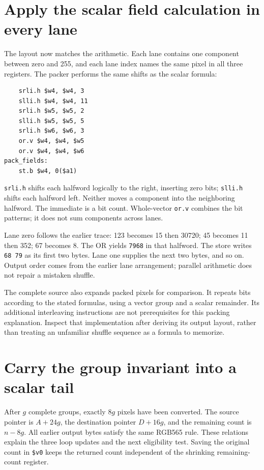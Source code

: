 \section{Apply the scalar field calculation in every lane}

The layout now matches the arithmetic. Each lane contains one component between
zero and 255, and each lane index names the same pixel in all three registers.
The packer performs the same shifts as the scalar formula:
\begin{verbatim}
    srli.h $w4, $w4, 3
    slli.h $w4, $w4, 11
    srli.h $w5, $w5, 2
    slli.h $w5, $w5, 5
    srli.h $w6, $w6, 3
    or.v $w4, $w4, $w5
    or.v $w4, $w4, $w6
pack_fields:
    st.b $w4, 0($a1)
\end{verbatim}
\texttt{srli.h} shifts each halfword logically to the right, inserting zero bits;
\texttt{slli.h} shifts each halfword left. Neither moves a component into the
neighboring halfword. The immediate is a bit count. Whole-vector \texttt{or.v}
combines the bit patterns; it does not sum components across lanes.

Lane zero follows the earlier trace: 123 becomes 15 then 30720; 45 becomes 11
then 352; 67 becomes 8. The OR yields \texttt{7968} in that halfword.
The store writes \texttt{68 79} as its first two bytes. Lane one supplies the
next two bytes, and so on. Output order comes from the earlier lane arrangement;
parallel arithmetic does not repair a mistaken shuffle.

The complete source also expands packed pixels for comparison. It repeats bits
according to the stated formulas, using a vector group and a scalar remainder.
Its additional interleaving instructions are not prerequisites for this packing
explanation. Inspect that implementation after deriving its output layout, rather
than treating an unfamiliar shuffle sequence as a formula to memorize.

\section{Carry the group invariant into a scalar tail}

After $g$ complete groups, exactly $8g$ pixels have been converted. The source
pointer is $A+24g$, the destination pointer $D+16g$, and the remaining count is
$n-8g$. All earlier output bytes satisfy the same RGB565 rule. These relations
explain the three loop updates and the next eligibility test. Saving the original
count in \texttt{\$v0} keeps the returned count independent of the shrinking
remaining-count register.

